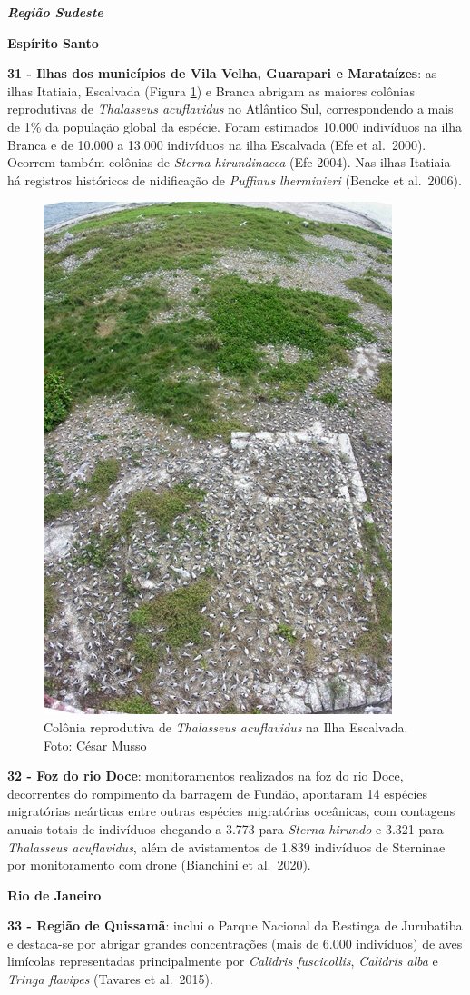 \documentclass[
  oneside]{scrbook}
\begin{document}
\textbf{\emph{Região Sudeste}}

\textbf{Espírito Santo}

\textbf{31 - Ilhas dos municípios de Vila Velha, Guarapari e Marataízes}: as ilhas Itatiaia, Escalvada (Figura \ref{fig:25}) e Branca abrigam as maiores colônias reprodutivas de \emph{Thalasseus acuflavidus} no Atlântico Sul, correspondendo a mais de 1\% da população global da espécie. Foram estimados 10.000 indivíduos na ilha Branca e de 10.000 a 13.000 indivíduos na ilha Escalvada (Efe et al.~2000). Ocorrem também colônias de \emph{Sterna hirundinacea} (Efe 2004). Nas ilhas Itatiaia há registros históricos de nidificação de \emph{Puffinus lherminieri} (Bencke et al.~2006).

\begin{figure}[H]

{\centering \includegraphics[width=0.4\linewidth]{imagens/cap07/Figura_7.5} 

}

\caption{Colônia reprodutiva de \emph{Thalasseus acuflavidus} na Ilha Escalvada. Foto: César Musso}\label{fig:25}
\end{figure}



\textbf{32 - Foz do rio Doce}: monitoramentos realizados na foz do rio Doce, decorrentes do rompimento da barragem de Fundão, apontaram 14 espécies migratórias neárticas entre outras espécies migratórias oceânicas, com contagens anuais totais de indivíduos chegando a 3.773 para \emph{Sterna hirundo} e 3.321 para \emph{Thalasseus acuflavidus}, além de avistamentos de 1.839 indivíduos de Sterninae por monitoramento com drone (Bianchini et al.~2020).

\textbf{Rio de Janeiro}

\textbf{33 - Região de Quissamã}: inclui o Parque Nacional da Restinga de Jurubatiba e destaca-se por abrigar grandes concentrações (mais de 6.000 indivíduos) de aves limícolas representadas principalmente por \emph{Calidris fuscicollis}, \emph{Calidris alba} e \emph{Tringa flavipes} (Tavares et al.~2015).
\end{document}
